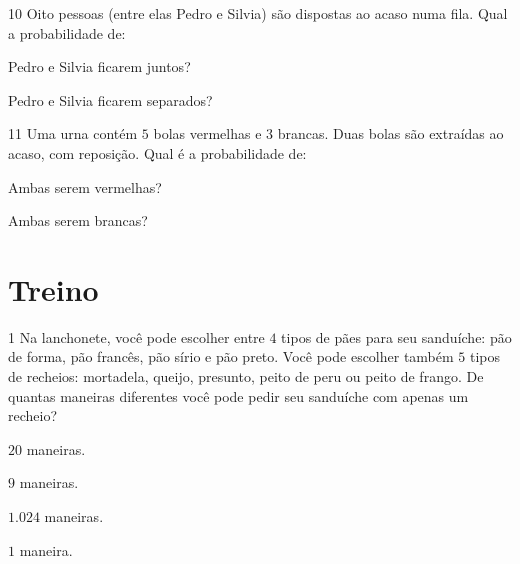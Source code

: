 \num{10} Oito pessoas (entre elas Pedro e Silvia) são dispostas ao acaso numa
fila. Qual a probabilidade de:

\begin{escolha}
\item Pedro e Silvia ficarem juntos? 
\item Pedro e Silvia ficarem separados? 
\end{escolha}

\num{11} Uma urna contém $5$ bolas vermelhas e $3$ brancas. Duas bolas são
extraídas ao acaso, com reposição. Qual é a probabilidade de:

\begin{escolha}
\item Ambas serem vermelhas? 
\item Ambas serem brancas? 
\end{escolha}

\section{Treino}

\num{1}  Na lanchonete, você pode escolher entre $4$ tipos de pães para seu
sanduíche: pão de forma, pão francês, pão sírio e pão preto. Você pode
escolher também $5$ tipos de recheios: mortadela, queijo, presunto, peito
de peru ou peito de frango. De quantas maneiras diferentes você pode
pedir seu sanduíche com apenas um recheio?

\begin{escolha}
\item $20$ maneiras.
\item $9$ maneiras.
\item $1.024$ maneiras.
\item $1$ maneira.
\end{escolha}


